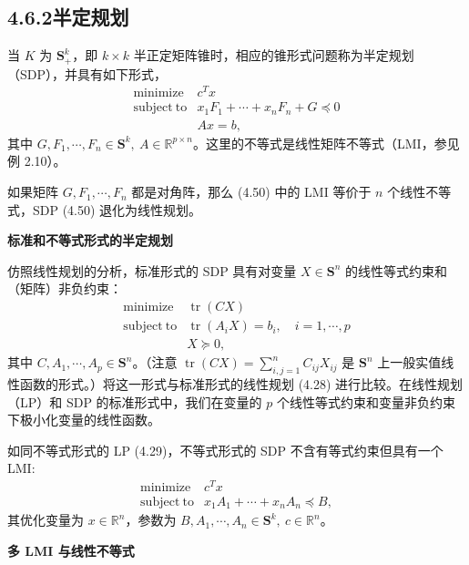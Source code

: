 \documentclass[UTF8, 12pt, fontset=fandol, oneside]{ctexart}
\begin{document}
\subsection*{4.6.2\quad 半定规划}

当 $K$ 为 $\mathbf{S}_+^k$，即 $k\times k$ 半正定矩阵锥时，相应的锥形式问题称为半定规划（SDP），并具有如下形式，
\begin{equation}
\begin{array}{ll}
\mathop{\mathrm{minimize}} & c^Tx\\
\mathrm{subject\ to} & x_1F_1+\cdots+x_nF_n+G\preceq 0\\
& Ax=b,
\end{array}
\tag{4.50}
\end{equation}
其中 $G,F_1,\cdots,F_n\in\mathbf{S}^k,\ A\in\mathbb{R}^{p\times n}$。这里的不等式是线性矩阵不等式（LMI，参见例 2.10）。

如果矩阵 $G,F_1,\cdots,F_n$ 都是对角阵，那么 (4.50) 中的 LMI 等价于 $n$ 个线性不等式，SDP (4.50) 退化为线性规划。

\noindent\textbf{标准和不等式形式的半定规划}

仿照线性规划的分析，标准形式的 SDP 具有对变量 $X\in\mathbf{S}^n$ 的线性等式约束和（矩阵）非负约束：
\begin{equation}
\begin{array}{ll}
\mathop{\mathrm{minimize}} & \operatorname{tr}(CX)\\
\mathrm{subject\ to} & \operatorname{tr}(A_iX)=b_i,\quad i=1,\cdots,p\\
& X\succeq 0,
\end{array}
\tag{4.51}
\end{equation}
其中 $C,A_1,\cdots,A_p\in\mathbf{S}^n$。（注意 $\operatorname{tr}(CX)=\sum_{i,j=1}^n C_{ij}X_{ij}$ 是 $\mathbf{S}^n$ 上一般实值线性函数的形式。）将这一形式与标准形式的线性规划 (4.28) 进行比较。在线性规划（LP）和 SDP 的标准形式中，我们在变量的 $p$ 个线性等式约束和变量非负约束下极小化变量的线性函数。

如同不等式形式的 LP (4.29)，不等式形式的 SDP 不含有等式约束但具有一个 LMI:
\[
\begin{array}{ll}
\mathop{\mathrm{minimize}} & c^Tx\\
\mathrm{subject\ to} & x_1A_1+\cdots+x_nA_n\preceq B,
\end{array}
\]
其优化变量为 $x\in\mathbb{R}^n$，参数为 $B,A_1,\cdots,A_n\in\mathbf{S}^k,\ c\in\mathbb{R}^n$。

\noindent\textbf{多 LMI 与线性不等式}
\end{document}
